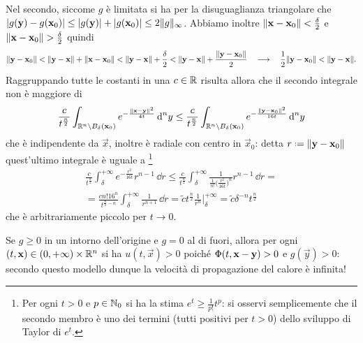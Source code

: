 Nel secondo, siccome $g$ è limitata si ha per la disuguaglianza triangolare che $\lvert g(\mathbf{y})-g(\mathbf{x}_0)\rvert\le\lvert g(\mathbf{y})\rvert+\lvert g(\mathbf{x}_0)\rvert\le 2\lVert g\rVert_\infty$.
Abbiamo inoltre $\lVert\mathbf{x}-\mathbf{x}_0\rVert<\frac{\delta}2$ e $\lVert\mathbf{x}-\mathbf{x}_0\rVert>\frac{\delta}2$ quindi
\begin{equation}
    \lVert\mathbf{y}-\mathbf{x}_0\rVert<
    \lVert\mathbf{y}-\mathbf{x}\rVert+\lVert\mathbf{x}-\mathbf{x}_0\rVert<
    \lVert\mathbf{y}-\mathbf{x}\rVert+\frac{\delta}2<
    \lVert\mathbf{y}-\mathbf{x}\rVert+\frac{\lVert\mathbf{y}-\mathbf{x}_0\rVert}2
    \quad\longrightarrow\quad
    \frac12\lVert\mathbf{y}-\mathbf{x}_0\rVert<\lVert\mathbf{y}-\mathbf{x}\rVert.
\end{equation}
Raggruppando tutte le costanti in una $c\in\mathbb{R}$ risulta allora che il secondo integrale non è maggiore di
\begin{equation}
    \frac{c}{t^\frac{n}2}\int_{\mathbb{R}^n\setminus B_\delta(\mathbf{x}_0)}e^{-\frac{\lVert\mathbf{x}-\mathbf{y}\rVert^2}{4t}}\,\textup{d}^ny\le
    \frac{c}{t^\frac{n}2}\int_{\mathbb{R}^n\setminus B_\delta(\mathbf{x}_0)}e^{-\frac{\lVert\mathbf{y}-\mathbf{x}_0\rVert^2}{16t}}\,\textup{d}^ny
\end{equation}
che è indipendente da $\vec x$, inoltre è radiale con centro in $\vec x_0$: detta $r\defeq\norm{\vec y-\vec x_0}$ quest'ultimo integrale è uguale a
\footnote{
    Per ogni $t>0$ e $p\in\mathbb{N}_0$ si ha la stima $e^t\ge\frac1{p!}t^p$: si osservi semplicemente che il secondo membro è uno dei termini (tutti positivi per $t>0$) dello sviluppo di Taylor di $e^t$.
}
\begin{multline}
    \frac{c}{t^\frac{n}2}\int_\delta^{+\infty}e^{-\frac{r^2}{16t}}r^{n-1}\,\dd r\le
    \frac{c}{t^\frac{n}2}\int_\delta^{+\infty}\frac1{\frac1{n!}\bigl(\frac{r^2}{16t}\bigr)^n}r^{n-1}\,\dd r=\\=
    \frac{cn!16^n}{t^{\frac{n}2-n}}\int_\delta^{+\infty}\frac1{r^{n+1}}\,\dd r=
    \tilde{c}t^\frac{n}2\frac1{r^n}\bigg|_\delta^{+\infty}=
    \tilde{c}\delta^{-n}t^\frac{n}2
\end{multline}
che è arbitrariamente piccolo per $t\to 0$.
\begin{osservazione} \label{o:propagazione-calore-velocita-infinita}
    Se $g\ge 0$ in un intorno dell'origine e $g=0$ al di fuori, allora per ogni $(t,\mathbf{x})\in(0,+\infty)\times\mathbb{R}^n$ si ha $u(t,\vec x)>0$ poich\'e $\Phi(t,\mathbf{x}-\mathbf{y})>0$ e $g(\vec y)>0$: secondo questo modello dunque la velocità di propagazione del calore è infinita!
\end{osservazione}

